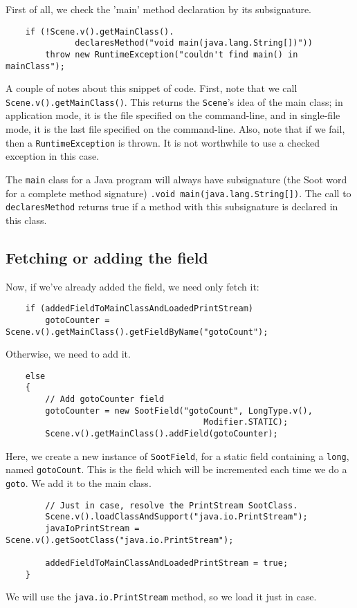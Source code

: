 \documentclass{article}
\begin{document}
First of all, we check the 'main' method declaration by its subsignature.
\begin{verbatim}
    if (!Scene.v().getMainClass().
              declaresMethod("void main(java.lang.String[])"))
        throw new RuntimeException("couldn't find main() in mainClass");
\end{verbatim}

A couple of notes about this snippet of code.  First, note that we
call {\tt Scene.v().getMainClass()}.  This returns the {\tt Scene}'s
idea of the main class; in application mode, it is the file specified
on the command-line, and in single-file mode, it is the last file
specified on the command-line.  Also, note that if we fail, then
a {\tt RuntimeException} is thrown.  It is not worthwhile to use a checked
exception in this case.

The {\tt main} class for a Java program will always have subsignature
(the Soot word for a complete method signature) {\tt .void
main(java.lang.String[])}. The call to {\tt declaresMethod} 
returns true if a method with this subsignature is declared in this
class.

\subsection{Fetching or adding the field}

Now, if we've already added the field, we need only fetch it:
\begin{verbatim}
    if (addedFieldToMainClassAndLoadedPrintStream)
        gotoCounter = Scene.v().getMainClass().getFieldByName("gotoCount");
\end{verbatim}

Otherwise, we need to add it.
\begin{verbatim}
    else
    {
        // Add gotoCounter field
        gotoCounter = new SootField("gotoCount", LongType.v(), 
                                        Modifier.STATIC);
        Scene.v().getMainClass().addField(gotoCounter);
\end{verbatim}

Here, we create a new instance of {\tt SootField}, for a static field
containing a {\tt long}, named {\tt gotoCount}.  This is the field
which will be incremented each time we do a {\tt goto}.  We add it to
the main class.

\begin{verbatim}
        // Just in case, resolve the PrintStream SootClass.
        Scene.v().loadClassAndSupport("java.io.PrintStream");
        javaIoPrintStream = Scene.v().getSootClass("java.io.PrintStream");
    
        addedFieldToMainClassAndLoadedPrintStream = true;
    }
\end{verbatim}
We will use the {\tt java.io.PrintStream} method, so we load it just
in case.
\end{document}
